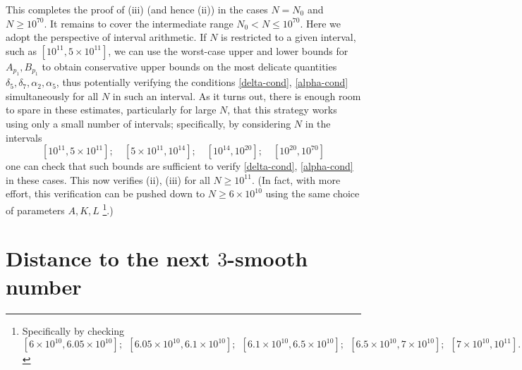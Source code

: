 \documentclass[10pt,a4paper,reqno]{amsart}
\numberwithin{equation}{section}
\theoremstyle{plain}
\theoremstyle{definition}
\begin{document}
This completes the proof of (iii) (and hence (ii)) in the cases $N=N_0$ and $N \geq 10^{70}$.  It remains to cover the intermediate range $N_0 < N \leq 10^{70}$.  Here we adopt the perspective of interval arithmetic.  If $N$ is restricted to a given interval, such as $[10^{11}, 5 \times 10^{11}]$, we can use the worst-case upper and lower bounds for $A_{p_1}, B_{p_1}$ to obtain conservative upper bounds on the most delicate quantities
$\delta_5, \delta_7, \alpha_2, \alpha_5$, thus potentially verifying the conditions \eqref{delta-cond}, \eqref{alpha-cond} simultaneously for all $N$ in such an interval.  As it turns out, there is enough room to spare in these estimates, particularly for large $N$, that this strategy works using only a small number of intervals; specifically, by considering $N$ in the intervals
$$ [10^{11}, 5 \times 10^{11}]; \quad [5 \times 10^{11}, 10^{14}]; \quad [10^{14}, 10^{20}]; \quad [10^{20}, 10^{70}]$$
one can check that such bounds are sufficient to verify \eqref{delta-cond}, \eqref{alpha-cond} in these cases.  This now verifies (ii), (iii) for all $N \geq 10^{11}$.
(In fact, with more effort, this verification can be pushed down to $N \geq 6 \times 10^{10}$ using the same choice of parameters $A,K,L$ \footnote{Specifically by checking $$ [6 \times 10^{10}, 6.05 \times 10^{10}]; \ \  [6.05 \times 10^{10}, 6.1 \times 10^{10}]; \ \  [6.1 \times 10^{10}, 6.5 \times 10^{10}]; \ \  [6.5 \times 10^{10}, 7 \times 10^{10}]; \ \  [7 \times 10^{10}, 10^{11}].$$}.)
  
\appendix

\section{Distance to the next \texorpdfstring{$3$}{3}-smooth number}\label{power-sec}
\end{document}
